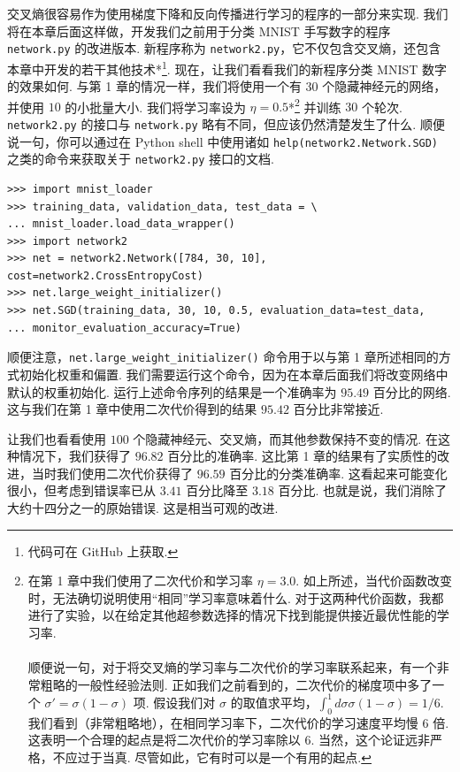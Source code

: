 交叉熵很容易作为使用梯度下降和反向传播进行学习的程序的一部分来实现. 我们将在本章后面这样做，开发我们之前用于分类 MNIST 手写数字的程序 \texttt{network.py} 的改进版本. 新程序称为 \texttt{network2.py}，它不仅包含交叉熵，还包含本章中开发的若干其他技术*\footnote{代码可在 GitHub 上获取.}. 现在，让我们看看我们的新程序分类 MNIST 数字的效果如何. 与第 1 章的情况一样，我们将使用一个有 $30$ 个隐藏神经元的网络，并使用 $10$ 的小批量大小. 我们将学习率设为 $\eta = 0.5$*\footnote{在第 1 章中我们使用了二次代价和学习率 $\eta = 3.0$. 如上所述，当代价函数改变时，无法确切说明使用``相同''学习率意味着什么. 对于这两种代价函数，我都进行了实验，以在给定其他超参数选择的情况下找到能提供接近最优性能的学习率. \\ \\ 顺便说一句，对于将交叉熵的学习率与二次代价的学习率联系起来，有一个非常粗略的一般性经验法则. 正如我们之前看到的，二次代价的梯度项中多了一个 $\sigma' = \sigma(1-\sigma)$ 项. 假设我们对 $\sigma$ 的取值求平均，$\int_0^1 d\sigma \sigma(1-\sigma) = 1/6$. 我们看到（非常粗略地），在相同学习率下，二次代价的学习速度平均慢 $6$ 倍. 这表明一个合理的起点是将二次代价的学习率除以 $6$. 当然，这个论证远非严格，不应过于当真. 尽管如此，它有时可以是一个有用的起点.} 并训练 $30$ 个轮次. \texttt{network2.py} 的接口与 \texttt{network.py} 略有不同，但应该仍然清楚发生了什么. 顺便说一句，你可以通过在 Python shell 中使用诸如 \texttt{help(network2.Network.SGD)} 之类的命令来获取关于 \texttt{network2.py} 接口的文档.

\begin{lstlisting}
>>> import mnist_loader
>>> training_data, validation_data, test_data = \
... mnist_loader.load_data_wrapper()
>>> import network2
>>> net = network2.Network([784, 30, 10], cost=network2.CrossEntropyCost)
>>> net.large_weight_initializer()
>>> net.SGD(training_data, 30, 10, 0.5, evaluation_data=test_data,
... monitor_evaluation_accuracy=True)

\end{lstlisting}

顺便注意，\texttt{net.large\_\allowbreak{}weight\_\allowbreak{}initializer()} 命令用于以与第 1 章所述相同的方式初始化权重和偏置. 我们需要运行这个命令，因为在本章后面我们将改变网络中默认的权重初始化. 运行上述命令序列的结果是一个准确率为 $95.49$ 百分比的网络. 这与我们在第 1 章中使用二次代价得到的结果 $95.42$ 百分比非常接近.

让我们也看看使用 $100$ 个隐藏神经元、交叉熵，而其他参数保持不变的情况. 在这种情况下，我们获得了 $96.82$ 百分比的准确率. 这比第 1 章的结果有了实质性的改进，当时我们使用二次代价获得了 $96.59$ 百分比的分类准确率. 这看起来可能变化很小，但考虑到错误率已从 $3.41$ 百分比降至 $3.18$ 百分比. 也就是说，我们消除了大约十四分之一的原始错误. 这是相当可观的改进.

